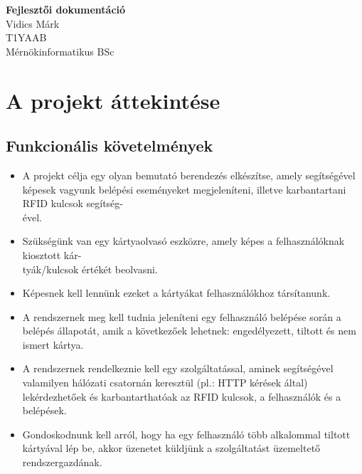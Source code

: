 \documentclass[11pt, a4paper]{article}
\begin{document}
	
	\begin{titlepage}
		\vspace*{\fill}
		\begin{center}
			\Huge \textbf{Fejlesztői dokumentáció} \\
			Vidics Márk \\
			T1YAAB \\
			Mérnökinformatikus BSc
		\end{center}
		\vspace*{\fill}
	\end{titlepage}
	
	\tableofcontents
	\listoftables
	
	\section{A projekt áttekintése}
		\subsection{Funkcionális követelmények}
			\begin{itemize}
			\justifying
				\item A projekt célja egy olyan bemutató berendezés elkészítse, amely segítségével képesek vagyunk belépési eseményeket megjeleníteni, illetve karbantartani RFID kulcsok segítség-\\ével.
				
				\item Szükségünk van egy kártyaolvasó eszközre, amely képes a felhasználóknak kiosztott kár-\\tyák/kulcsok értékét beolvasni.
				
				\item Képesnek kell lennünk ezeket a kártyákat felhasználókhoz társítanunk.
				
				\item A rendszernek meg kell tudnia jeleníteni egy felhasználó belépése során a belépés állapotát, amik a következőek lehetnek: engedélyezett, tiltott és nem ismert kártya.
				
				\item A rendszernek rendelkeznie kell egy szolgáltatással, aminek segítségével valamilyen hálózati csatornán keresztül (pl.: HTTP kérések által) lekérdezhetőek és karbantarthatóak az RFID kulcsok, a felhasználók és a belépések.
				
				\item Gondoskodnunk kell arról, hogy ha egy felhasználó több alkalommal tiltott kártyával lép be, akkor üzenetet küldjünk a szolgáltatást üzemeltető rendszergazdának.
			\end{itemize}
		\vfill
\end{document}
